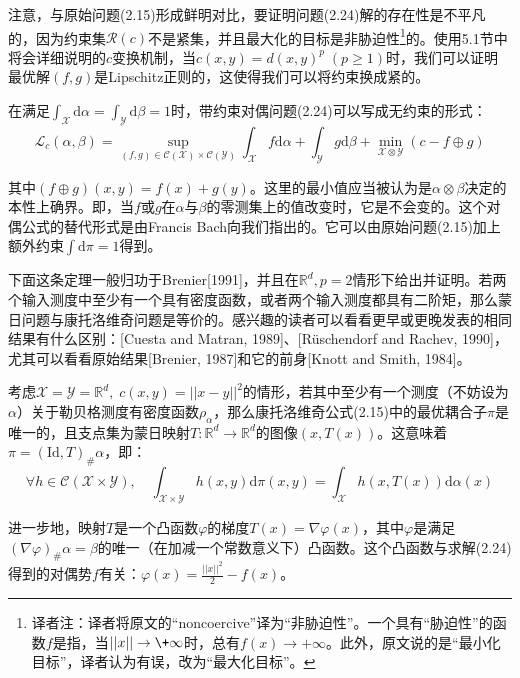 \documentclass[cn,10pt,math=newtx,citestyle=gb7714-2015,bibstyle=gb7714-2015]{elegantbook}
\begin{document}
注意，与原始问题(2.15)形成鲜明对比，要证明问题(2.24)解的存在性是不平凡的，因为约束集$\mathcal{R}(c)$不是紧集，并且最大化的目标是非胁迫性\footnote{译者注：译者将原文的“noncoercive”译为“非胁迫性”。一个具有“胁迫性”的函数$f$是指，当$||x||\to\+\infty$时，总有$f(x)\to+\infty$。此外，原文说的是“最小化目标”，译者认为有误，改为“最大化目标”。}的。使用5.1节中将会详细说明的$c$变换机制，当$c(x,y)=d(x,y)^p\;(p\geq 1)$时，我们可以证明最优解$(f,g)$是Lipschitz正则的，这使得我们可以将约束换成紧的。

\begin{postulate}[无约束对偶]
在满足$\int_\mathcal{X}\text{d}\alpha=\int_\mathcal{Y}\text{d}\beta=1$时，带约束对偶问题(2.24)可以写成无约束的形式：
\begin{equation}
    \label{2.27}
    \mathcal{L}_c(\alpha,\beta)=\sup\limits_{(f,g)\in\mathcal{C(X)}\times\mathcal{C(Y)}} \int_\mathcal{X}f\text{d}\alpha + \int_\mathcal{Y}g\text{d}\beta+\min\limits_{\mathcal{X}\otimes \mathcal{Y}}(c-f\oplus g)
\end{equation}

其中$(f\oplus g)(x,y)=f(x)+g(y)$。这里的最小值应当被认为是$\alpha\otimes \beta$决定的本性上确界。即，当$f$或$g$在$\alpha$与$\beta$的零测集上的值改变时，它是不会变的。这个对偶公式的替代形式是由Francis Bach向我们指出的。它可以由原始问题(2.15)加上额外约束$\int \text{d}\pi=1$得到。

\end{postulate}

\begin{postulate}
下面这条定理一般归功于Brenier[1991]，并且在$\mathbb{R}^d,p=2$情形下给出并证明。若两个输入测度中至少有一个具有密度函数，或者两个输入测度都具有二阶矩，那么蒙日问题与康托洛维奇问题是等价的。感兴趣的读者可以看看更早或更晚发表的相同结果有什么区别：[Cuesta and Matran, 1989]、[R\"uschendorf and Rachev, 1990]，尤其可以看看原始结果[Brenier, 1987]和它的前身[Knott and Smith, 1984]。
\end{postulate}

\begin{theorem}[Brenier]
考虑$\mathcal{X}=\mathcal{Y}=\mathbb{R}^d,\; c(x,y)=||x-y||^2$的情形，若其中至少有一个测度（不妨设为$\alpha$）关于勒贝格测度有密度函数$\rho_\alpha$，那么康托洛维奇公式(2.15)中的最优耦合子$\pi$是唯一的，且支点集为蒙日映射$T:\mathbb{R}^d\to\mathbb{R}^d$的图像$(x,T(x))$。这意味着$\pi=(\text{Id},T)_\# \alpha$，即：
\begin{equation}
    \label{2.28}
    \forall h\in \mathcal{C}(\mathcal{X}\times \mathcal{Y}),\quad \int_{\mathcal{X}\times \mathcal{Y}}h(x,y)\text{d}\pi(x,y)=\int_\mathcal{X}h(x,T(x))\text{d}\alpha(x)
\end{equation}

进一步地，映射$T$是一个凸函数$\varphi$的梯度$T(x)=\nabla \varphi(x)$，其中$\varphi$是满足$(\nabla \varphi)_\# \alpha=\beta$的唯一（在加减一个常数意义下）凸函数。这个凸函数与求解(2.24)得到的对偶势$f$有关：$\varphi(x)=\frac{||x||^2}{2}-f(x)$。

\end{theorem}
\end{document}

